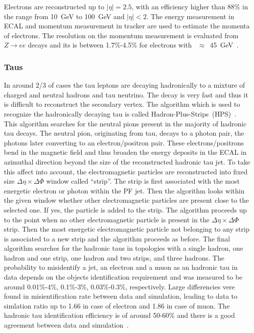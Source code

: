 Electrons are reconstructed up to $|\eta|=2.5$,  with an efficiency higher than 88\% in the \pt range from 10~GeV to 100~GeV and $|\eta|<2$. The energy measurement in ECAL and momentum measurement in tracker are used to estimate the momenta of electrons. The resolution on the momentum measurement is evaluated from $Z \rightarrow ee$ decays and its is between 1.7\%-4.5\% for electrons with  \pt~$\approx$~45~GeV~\cite{Khachatryan:2015hwa}.



\subsubsection{Taus}

In around 2/3 of cases the tau leptons are decaying hadronically to a mixture of charged and neutral hadrons and tau neutrino. The decay is very fast and thus it is difficult to reconstruct the secondary vertex. The algorithm which is used to recognize the hadronically decaying tau is called Hadron-Plus-Strips~(HPS)~\cite{CMS:2016gvn}. This algorithm searches for the neutral pions present in the majority of hadronic tau decays. The neutral pion, originating from tau, decays to a photon pair, the photons later converting to an electron/positron pair. These electrons/positrons bend in the magnetic field and thus broaden the energy deposits in the ECAL in azimuthal direction beyond the size of the reconstructed hadronic tau jet. To take this affect into account, the electromagnetic particles  are reconstructed into fixed size $\Delta \eta \times \Delta \Phi$ window called ``strip''. The strip is first associated with the most energetic electron or photon within the PF jet. Then the algorithm looks within the given window whether other electromagnetic particles are present close to the selected one. If yes, the particle is added to the strip. The algorithm proceeds up to the point when no other electromagnetic particle is present in the $\Delta \eta \times \Delta \Phi$ strip. Then the most energetic electromagnetic particle not belonging to any strip is associated to a new strip and the algorithm proceeds as before. The final algorithm searches for the hadronic taus in topologies with a single hadron, one hadron and one strip, one hadron and two strips, and three hadrons. The probability to misidentify a jet, an electron and a muon as an hadronic tau in data depends on the objects identification requirement and was measured to be around 0.01\%-4\%, 0.1\%-3\%, 0.03\%-0.3\%, respectively. Large differencies vere found in misientification rate between data and simulation, leading to data to simlation ratio up to 1.66 in case of electron and 1.86 in case of muon. The hadronic tau identification efficiency is of around 50-60\% and there is a good agreement between data and simulation~\cite{Khachatryan:2015dfa}.

